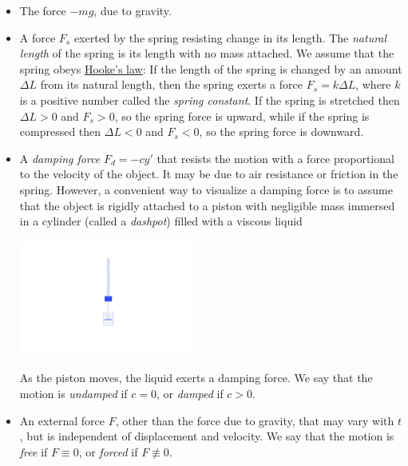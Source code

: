 \documentclass{ximera}
\begin{document}
\begin{itemize}
\item The force $-mg$, due to gravity.
 
\item A force $F_s$ exerted by the spring resisting change in its
length. The \textit{natural length} of the spring is its length with
no mass attached. We assume that the spring obeys
\href{http://www-history.mcs.st-and.ac.uk/Mathematicians/Hooke.html}
{Hooke's law}:
If the length of the spring is changed by an amount $\Delta L$
from its natural length,  then the spring exerts a force $F_s=k\Delta
L$, where $k$ is a positive number called the \textit{spring constant}.
If the spring is stretched then  $\Delta L>0$ and $F_s>0$, so the
spring force is upward, while if the spring is compressed then $\Delta
L<0$ and $F_s<0$, so the spring force is downward.
 
\item A \textit{damping force} $F_d=-cy'$ that resists the motion with
a force proportional to the velocity of the object. It may be due to
air resistance or friction in the spring. However, a convenient way to
visualize a damping force is to assume that the object is rigidly
attached to a piston with negligible mass immersed in a cylinder
(called a \textit{dashpot}) filled with a viscous liquid
 
\begin{image}
  \includegraphics[height=1.5in]{fig060102.jpg}
\end{image}
 
As the piston moves, the liquid exerts a
damping force. We say that the motion is \textit{undamped} if $c=0$, or
\textit{damped} if $c>0$.
 
 
\item An external force $F$, other than the force due to gravity, that
may vary with $t$, but is independent of displacement and velocity. We
say that the motion is \textit{free} if $F\equiv0$, or \textit{forced}
if $F\not\equiv0$.
 
\end{itemize}
 
\end{document}
